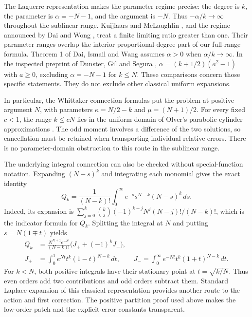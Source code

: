 The Laguerre representation makes the parameter regime precise: the degree is $k$, the parameter is $\alpha=-N-1$, and the argument is $-N$. Thus $-\alpha/k\to\infty$ throughout the sublinear range. Kuijlaars and McLaughlin \cite[Theorem 7.1 and Remark 5.4]{KM}, and the regime announced by Dai and Wong \cite{DW}, treat a finite limiting ratio greater than one. Their parameter ranges overlap the interior proportional-degree part of our full-range formula. Theorem 1 of Dai, Ismail and Wang \cite{DIW} assumes $\alpha>0$ when $\alpha/k\to\infty$. In the inspected preprint of Dunster, Gil and Segura \cite[Section 1, equation (1.6) and Cases 1a, 1b and 2]{DGS}, $\alpha=(k+1/2)(a^2-1)$ with $a\ge0$, excluding $\alpha=-N-1$ for $k\le N$. These comparisons concern those specific statements. They do not exclude other classical uniform expansions.

In particular, the Whittaker connection formulas put the problem at positive argument $N$, with parameters $\kappa=N/2-k$ and $\mu=(N+1)/2$. For every fixed $c<1$, the range $k\le cN$ lies in the uniform domain of Olver's parabolic-cylinder approximations \cite{Olver,DLMFWhittaker}. The odd moment involves a difference of the two solutions, so cancellation must be retained when transporting individual relative errors. There is no parameter-domain obstruction to this route in the sublinear range.

The underlying integral connection can also be checked without special-function notation. Expanding $(N-s)^k$ and integrating each monomial gives the exact identity
\begin{equation}\label{eq:gammaidentity}
Q_k=\frac1{(N-k)!}\int_0^\infty
e^{-s}s^{N-k}(N-s)^k\,ds.
\end{equation}
Indeed, its expansion is
$\sum_{j=0}^k\binom kj(-1)^{k-j}N^j(N-j)!/(N-k)!$,
which is the indicator formula for $Q_k$. Splitting the integral at $N$ and putting $s=N(1\mp t)$ yields
\begin{align*}
Q_k&=\frac{N^{N+1}e^{-N}}{(N-k)!}
\bigl(J_++(-1)^kJ_-\bigr),\\
J_+&=\int_0^1 e^{Nt}t^k(1-t)^{N-k}\,dt,\qquad
J_-=\int_0^\infty e^{-Nt}t^k(1+t)^{N-k}\,dt.
\end{align*}
For $k<N$, both positive integrals have their stationary point at $t=\sqrt{k/N}$. Thus even orders add two contributions and odd orders subtract them. Standard Laplace expansion of this classical representation provides another route to the action and first correction. The positive partition proof used above makes the low-order patch and the explicit error constants transparent.

